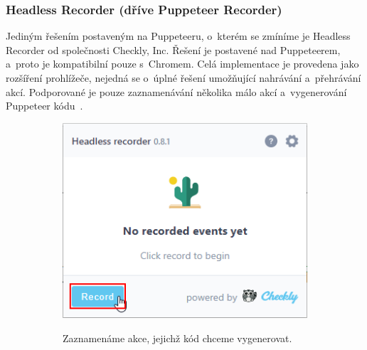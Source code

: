 \documentclass[12pt, a4paper, twoside]{article}
\begin{document}
	\subsubsection{Headless Recorder (dříve Puppeteer Recorder)}
	Jediným řešením postaveným na Puppeteeru, o~kterém se zmíníme je Headless Recorder od společnosti Checkly, Inc. Řešení je postavené nad Puppeteerem, a~proto je kompatibilní pouze s~Chromem. Celá implementace je provedena jako rozšíření prohlížeče, nejedná se o~úplné řešení umožňující nahrávání a~přehrávání akcí. Podporované je pouze zaznamenávání několika málo akcí a~vygenerování Puppeteer kódu~\cite{checkly}.
	\newpage
	\hspace{0pt}
	\vfill
	\begin{figure}[H]
		\centering
		\begin{subfigure}{0.47\textwidth}
			\includegraphics[width=1\textwidth]{headlessRecorder1.png}
		\end{subfigure}
		\textrightarrow
		\begin{subfigure}{0.47\textwidth}
			\begin{adjustwidth}{0.2cm}{0cm}
				Zaznamenáme akce, jejichž kód chceme vygenerovat.
			\end{adjustwidth}
		\end{subfigure}
	\end{figure}
	\hfill
	\begin{minipage}{0.5\textwidth}
		\centering
		\vspace{-4.0cm}
		\textdownarrow	
	\end{minipage}
\end{document}
